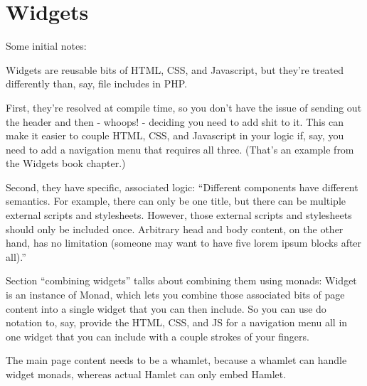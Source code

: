 \section{Widgets}

Some initial notes:

Widgets are reusable bits of HTML, CSS, and Javascript, but they're treated differently than, say, file includes in PHP.

First, they're resolved at compile time, so you don't have the issue of sending out the header and then - whoops! - deciding you need to add shit to it. This can make it easier to couple HTML, CSS, and Javascript in your logic if, say, you need to add a navigation menu that requires all three. (That's an example from the Widgets book chapter.)

Second, they have specific, associated logic: ``Different components have different semantics. For example, there can only be one title, but there can be multiple external scripts and stylesheets. However, those external scripts and stylesheets should only be included once. Arbitrary head and body content, on the other hand, has no limitation (someone may want to have five lorem ipsum blocks after all).''

Section ``combining widgets'' talks about combining them using monads: Widget is an instance of Monad, which lets you combine those associated bits of page content into a single widget that you can then include. So you can use do notation to, say, provide the HTML, CSS, and JS for a navigation menu all in one widget that you can include with a couple strokes of your fingers.

The main page content needs to be a whamlet, because a whamlet can handle widget monads, whereas actual Hamlet can only embed Hamlet.
